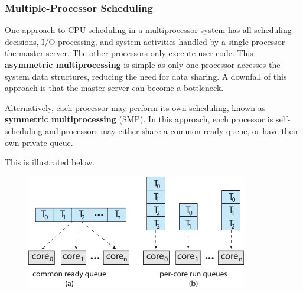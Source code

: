 \documentclass{article}
\begin{document}
\subsubsection{Multiple-Processor Scheduling}
One approach to CPU scheduling in a multiprocessor system has all
scheduling decisions, I/O processing, and system activities handled by
a single processor --- the master server. The other processors only
execute user code. This \textbf{asymmetric multiprocessing} is simple
as only one processor accesses the system data structures, reducing the
need for data sharing. A downfall of this approach is that the master
server can become a bottleneck.

Alternatively, each processor may perform its own scheduling, known as
\textbf{symmetric multiprocessing} (SMP). In this approach, each
processor is self-scheduling and processors may either share a common
ready queue, or have their own private queue.

This is illustrated below.
\begin{figure}[H]
    \centering
    \includegraphics[height = 5cm]{figures/multiprocessor_scheduling.pdf}
\end{figure}
\end{document}
